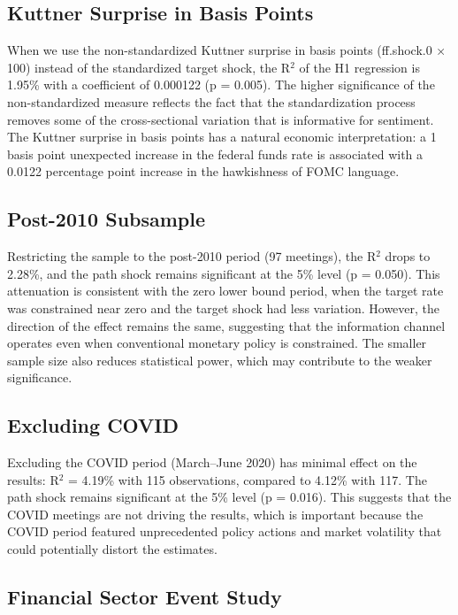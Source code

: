 \subsection{Kuttner Surprise in Basis Points}

When we use the non-standardized Kuttner surprise in basis points (ff.shock.0 × 100) instead of the standardized target shock, the R$^2$ of the H1 regression is 1.95\% with a coefficient of 0.000122 (p = 0.005). The higher significance of the non-standardized measure reflects the fact that the standardization process removes some of the cross-sectional variation that is informative for sentiment. The Kuttner surprise in basis points has a natural economic interpretation: a 1 basis point unexpected increase in the federal funds rate is associated with a 0.0122 percentage point increase in the hawkishness of FOMC language.

\subsection{Post-2010 Subsample}

Restricting the sample to the post-2010 period (97 meetings), the R$^2$ drops to 2.28\%, and the path shock remains significant at the 5\% level (p = 0.050). This attenuation is consistent with the zero lower bound period, when the target rate was constrained near zero and the target shock had less variation. However, the direction of the effect remains the same, suggesting that the information channel operates even when conventional monetary policy is constrained. The smaller sample size also reduces statistical power, which may contribute to the weaker significance.

\subsection{Excluding COVID}

Excluding the COVID period (March--June 2020) has minimal effect on the results: R$^2$ = 4.19\% with 115 observations, compared to 4.12\% with 117. The path shock remains significant at the 5\% level (p = 0.016). This suggests that the COVID meetings are not driving the results, which is important because the COVID period featured unprecedented policy actions and market volatility that could potentially distort the estimates.

\subsection{Financial Sector Event Study}

